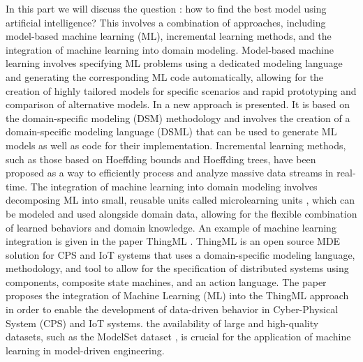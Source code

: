 In this part we will discuss the question : how to find the best model using artificial intelligence? This involves a combination of approaches, including model-based machine learning (ML), incremental learning methods, and the integration of machine learning into domain modeling. 
Model-based machine learning involves specifying ML problems using a dedicated modeling language and generating the corresponding ML code automatically, allowing for the creation of highly tailored models for specific scenarios and rapid prototyping and comparison of alternative models\cite{evolutionMDE}. In \cite{mdApproach} a new approach is presented. It is based on the domain-specific modeling (DSM) methodology and involves the creation of a domain-specific modeling language (DSML) that can be used to generate ML models as well as code for their implementation.
Incremental learning methods, such as those based on Hoeffding bounds and Hoeffding trees, have been proposed as a way to efficiently process and analyze massive data streams in real-time\cite{evolutionMDE}. 
The integration of machine learning into domain modeling involves decomposing ML into small, reusable units called microlearning units \cite{evolutionMDE}, which can be modeled and used alongside domain data, allowing for the flexible combination of learned behaviors and domain knowledge. An example of machine learning integration is given in the paper ThingML \cite{ThingML}.  ThingML is an open source MDE solution for CPS and IoT systems that uses a domain-specific modeling language, methodology, and tool to allow for the specification of distributed systems using components, composite state machines, and an action language. The paper proposes the integration of Machine Learning (ML) into the ThingML approach in order to enable the development of data-driven behavior in Cyber-Physical System (CPS) and IoT systems.
the availability of large and high-quality datasets, such as the ModelSet dataset \cite{modelset}, is crucial for the application of machine learning in model-driven engineering.


